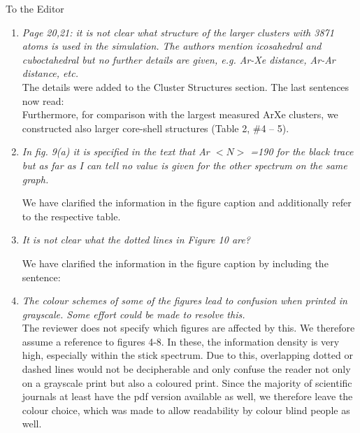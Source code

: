 \documentclass[DIN,pagenumber=false,parskip=half,fromalign=left,fromphone=true,fromemail=true,fromurl=false,fromlogo=false,fromrule=false]{scrlttr2}
\begin{document}
\begin{letter}{To the Editor}
\begin{enumerate}
 \item \emph{Page 20,21:
       it is not clear what structure of the larger clusters with 3871 atoms is used in the simulation. The authors mention icosahedral and cuboctahedral but no further details are given, e.g. Ar-Xe distance, Ar-Ar distance, etc.}\\
       The details were added to the Cluster Structures section. The last
       sentences now read:\\
       Furthermore, for comparison with the largest measured ArXe clusters,
       we constructed also larger core-shell structures (Table 2, \#4 – 5).
       {}

 \item \emph{In fig. 9(a) it is specified in the text that  Ar $<N>$ =190 for the black trace but as far as I can tell no value is given for the other spectrum on the same graph.}

	We have clarified the information in the figure caption and additionally refer to the respective table.

 \item \emph{It is not clear what the dotted lines in Figure 10 are?}

 We have clarified the information in the figure caption by including the sentence: {\color{blue}{The dotted line shows the unscaled spectrum in this region.}}

 \item \emph{The colour schemes of some of the figures lead to confusion when printed in grayscale. Some effort could be made to resolve this.}\vspace{0.3cm}\\
       The reviewer does not specify which figures are affected by this.
       We therefore assume a reference to figures 4-8. In these, the
       information density is very high, especially within the stick spectrum.
       Due to this, overlapping dotted or dashed lines would not be
       decipherable and only confuse the reader not only on a grayscale print
       but also a coloured print. Since the majority of scientific journals
       at least have the pdf version available as well, we therefore leave
       the colour choice, which was made to allow readability by
       colour blind people as well.


\end{enumerate}
\end{letter}
\end{document}
